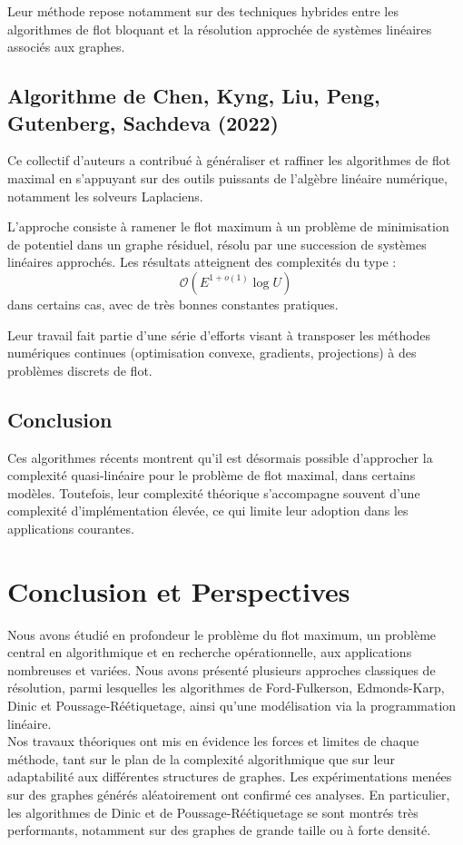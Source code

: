 \documentclass[a4paper]{article}
\begin{document}
Leur méthode repose notamment sur des techniques hybrides entre les algorithmes de flot bloquant et la résolution approchée de systèmes linéaires associés aux graphes.

\subsection{Algorithme de Chen, Kyng, Liu, Peng, Gutenberg, Sachdeva (2022)}
Ce collectif d’auteurs a contribué à généraliser et raffiner les algorithmes de flot maximal en s’appuyant sur des outils puissants de l’algèbre linéaire numérique, notamment les solveurs Laplaciens.

L’approche consiste à ramener le flot maximum à un problème de minimisation de potentiel dans un graphe résiduel, résolu par une succession de systèmes linéaires approchés\cite{chen2022maximumflowminimumcostflow}. Les résultats atteignent des complexités du type :
\[
\mathcal{O}\left(E^{1 + o(1)} \log U\right)
\]
dans certains cas, avec de très bonnes constantes pratiques.

Leur travail fait partie d’une série d’efforts visant à transposer les méthodes numériques continues (optimisation convexe, gradients, projections) à des problèmes discrets de flot.

\subsection{Conclusion}
Ces algorithmes récents montrent qu’il est désormais possible d’approcher la complexité quasi-linéaire pour le problème de flot maximal, dans certains modèles. Toutefois, leur complexité théorique s’accompagne souvent d’une complexité d’implémentation élevée, ce qui limite leur adoption dans les applications courantes.

\section{Conclusion et Perspectives}

Nous avons étudié en profondeur le problème du flot maximum, un problème central en algorithmique et en recherche opérationnelle, aux applications nombreuses et variées. Nous avons présenté plusieurs approches classiques de résolution, parmi lesquelles les algorithmes de Ford-Fulkerson, Edmonds-Karp, Dinic et Poussage-Réétiquetage, ainsi qu’une modélisation via la programmation linéaire.\\

Nos travaux théoriques ont mis en évidence les forces et limites de chaque méthode, tant sur le plan de la complexité algorithmique que sur leur adaptabilité aux différentes structures de graphes. Les expérimentations menées sur des graphes générés aléatoirement ont confirmé ces analyses. En particulier, les algorithmes de Dinic et de Poussage-Réétiquetage se sont montrés très performants, notamment sur des graphes de grande taille ou à forte densité.\\
\end{document}
